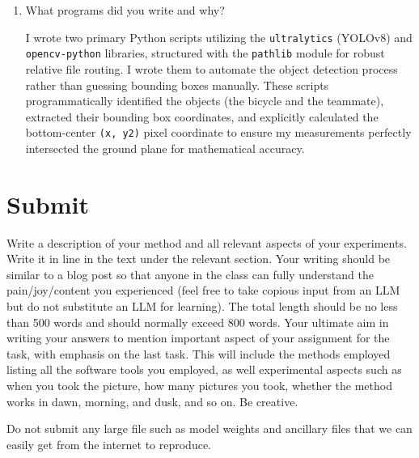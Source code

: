 \begin{enumerate}
\item What programs did you write and why?
\begin{studentSpace}
I wrote two primary Python scripts utilizing the \texttt{ultralytics} (YOLOv8) and \texttt{opencv-python} libraries, structured with the \texttt{pathlib} module for robust relative file routing. I wrote them to automate the object detection process rather than guessing bounding boxes manually. These scripts programmatically identified the objects (the bicycle and the teammate), extracted their bounding box coordinates, and explicitly calculated the bottom-center \texttt{(x, y2)} pixel coordinate to ensure my measurements perfectly intersected the ground plane for mathematical accuracy.
\end{studentSpace}


\end{enumerate}

\section{Submit}

Write a description of your method and all relevant aspects of your
experiments.
Write it in line in the text under the relevant section.
Your writing should be similar to  a blog post so that anyone in the class can fully understand the pain/joy/content you experienced (feel free to take copious input from an LLM but do not substitute an LLM for learning).
The total length should be no less than 500 words and
should normally exceed 800 words.
Your ultimate aim in writing your answers
to mention important aspect of your assignment for the task, with
emphasis on the last task.
This will include the methods employed
listing all the software tools you employed, as well experimental
aspects such as when you took the picture, how many pictures 
you took, whether the method works in dawn, morning, and dusk, and so
on.
Be creative.  

Do not submit any large file such as
model weights and ancillary files that we can easily get from the
internet to reproduce.

\begin{studentSpace}

\end{studentSpace}